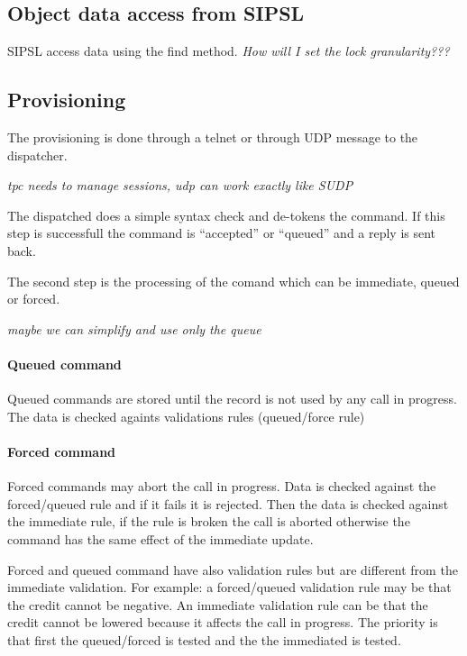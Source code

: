 \documentclass[a4paper]{article}
\begin{document}
\subsection{Object data access from SIPSL}
SIPSL access data using the find method. 
{\em How will I set the lock granularity??? }

\subsection{Provisioning}

The provisioning is done through a telnet or through UDP message to the
dispatcher.


{\em tpc needs to manage sessions, udp can work exactly like SUDP}


The dispatched does a simple syntax check and de-tokens the command.
If this step is successfull the command is ``accepted'' or ``queued'' and a reply is
sent back.


The second step is the processing of the comand which can be immediate, 
queued or forced. 

{\em maybe we can simplify and use only the queue}


\paragraph{Queued command}

Queued commands are stored until the record is not used by any call in progress.
The data is checked againts validations rules (queued/force rule)

\paragraph{Forced command}

Forced commands may abort the call in progress. Data is checked against
the forced/queued rule and if it fails it is rejected.
Then the data is checked against the immediate rule, if the rule is
broken the call is aborted otherwise the command has the same effect of
the immediate update.

Forced and queued command have also validation rules but are different from the
immediate validation. For example: a forced/queued validation rule may be that
the credit cannot be negative. An immediate validation rule can be that the
credit cannot be lowered because it affects the call in progress.
The priority is that first the queued/forced is tested and the the immediated
is tested.
\end{document}
